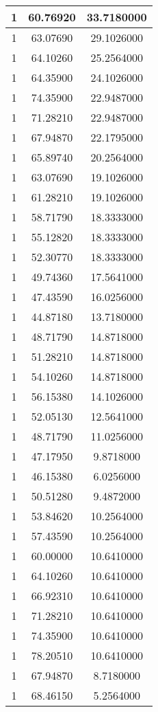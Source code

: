 \documentclass[
]{book}
\begin{document}
\begin{tabular}{c|c|c}
\hline
1 & 60.76920 & 33.7180000\\
\hline
1 & 63.07690 & 29.1026000\\
\hline
1 & 64.10260 & 25.2564000\\
\hline
1 & 64.35900 & 24.1026000\\
\hline
1 & 74.35900 & 22.9487000\\
\hline
1 & 71.28210 & 22.9487000\\
\hline
1 & 67.94870 & 22.1795000\\
\hline
1 & 65.89740 & 20.2564000\\
\hline
1 & 63.07690 & 19.1026000\\
\hline
1 & 61.28210 & 19.1026000\\
\hline
1 & 58.71790 & 18.3333000\\
\hline
1 & 55.12820 & 18.3333000\\
\hline
1 & 52.30770 & 18.3333000\\
\hline
1 & 49.74360 & 17.5641000\\
\hline
1 & 47.43590 & 16.0256000\\
\hline
1 & 44.87180 & 13.7180000\\
\hline
1 & 48.71790 & 14.8718000\\
\hline
1 & 51.28210 & 14.8718000\\
\hline
1 & 54.10260 & 14.8718000\\
\hline
1 & 56.15380 & 14.1026000\\
\hline
1 & 52.05130 & 12.5641000\\
\hline
1 & 48.71790 & 11.0256000\\
\hline
1 & 47.17950 & 9.8718000\\
\hline
1 & 46.15380 & 6.0256000\\
\hline
1 & 50.51280 & 9.4872000\\
\hline
1 & 53.84620 & 10.2564000\\
\hline
1 & 57.43590 & 10.2564000\\
\hline
1 & 60.00000 & 10.6410000\\
\hline
1 & 64.10260 & 10.6410000\\
\hline
1 & 66.92310 & 10.6410000\\
\hline
1 & 71.28210 & 10.6410000\\
\hline
1 & 74.35900 & 10.6410000\\
\hline
1 & 78.20510 & 10.6410000\\
\hline
1 & 67.94870 & 8.7180000\\
\hline
1 & 68.46150 & 5.2564000\\

\end{tabular}
\end{document}
